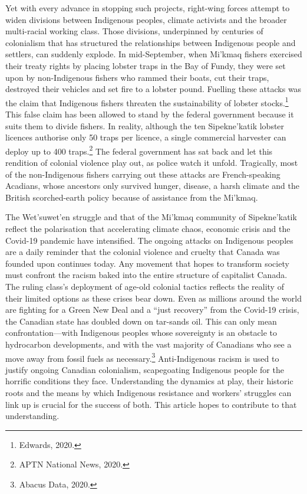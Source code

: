Yet with every advance in stopping such projects, right-wing forces attempt to widen divisions between Indigenous peoples, climate activists and the broader multi-racial working class. Those divisions, underpinned by centuries of colonialism that has structured the relationships between Indigenous people and settlers, can suddenly explode. In mid-September, when Mi'kmaq fishers exercised their treaty rights by placing lobster traps in the Bay of Fundy, they were set upon by non-Indigenous fishers who rammed their boats, cut their traps, destroyed their vehicles and set fire to a lobster pound. Fuelling these attacks was the claim that Indigenous fishers threaten the sustainability of lobster stocks.\footnote{Edwards, 2020.} This false claim has been allowed to stand by the federal government because it suits them to divide fishers. In reality, although the ten Sipekne'katik lobster licences authorise only 50 traps per licence, a single commercial harvester can deploy up to 400 traps.\footnote{APTN National News, 2020.} The federal government has sat back and let this rendition of colonial violence play out, as police watch it unfold. Tragically, most of the non-Indigenous fishers carrying out these attacks are French-speaking Acadians, whose ancestors only survived hunger, disease, a harsh climate and the British scorched-earth policy because of assistance from the Mi'kmaq.

The Wet'suwet'en struggle and that of the Mi'kmaq community of Sipekne'katik reflect the polarisation that accelerating climate chaos, economic crisis and the Covid-19 pandemic have intensified. The ongoing attacks on Indigenous peoples are a daily reminder that the colonial violence and cruelty that Canada was founded upon continues today. Any movement that hopes to transform society must confront the racism baked into the entire structure of capitalist Canada. The ruling class's deployment of age-old colonial tactics reflects the reality of their limited options as these crises bear down. Even as millions around the world are fighting for a Green New Deal and a ``just recovery'' from the Covid-19 crisis, the Canadian state has doubled down on tar-sands oil. This can only mean confrontation---with Indigenous peoples whose sovereignty is an obstacle to hydrocarbon developments, and with the vast majority of Canadians who see a move away from fossil fuels as necessary.\footnote{Abacus Data, 2020.} Anti-Indigenous racism is used to justify ongoing Canadian colonialism, scapegoating Indigenous people for the horrific conditions they face. Understanding the dynamics at play, their historic roots and the means by which Indigenous resistance and workers' struggles can link up is crucial for the success of both. This article hopes to contribute to that understanding.

